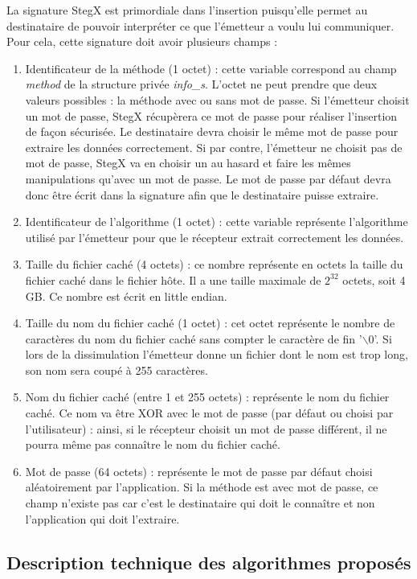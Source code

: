 \documentclass[11pt]{article}
\begin{document}
La signature StegX est primordiale dans l'insertion puisqu'elle permet au 
destinataire de pouvoir interpréter ce que l'émetteur a voulu lui communiquer. 
Pour cela, cette signature doit avoir plusieurs champs : 
\begin {enumerate}
\item Identificateur de la méthode (1 octet) : cette variable correspond au 
champ \textit{method} de la structure privée \textit{info\_s}. L'octet ne 
peut prendre que deux valeurs possibles : la méthode avec ou sans mot de 
passe. Si l'émetteur choisit un mot de passe, StegX récupèrera ce mot de 
passe pour réaliser l'insertion de façon sécurisée. Le destinataire devra 
choisir le même mot de passe pour extraire les données correctement. 
Si par contre, l'émetteur ne choisit pas de mot de passe, StegX va en choisir 
un au hasard et faire les mêmes manipulations qu'avec un mot de passe. 
Le mot de passe par défaut devra donc être écrit dans la signature afin que 
le destinataire puisse extraire. 
\item Identificateur de l'algorithme (1 octet) : cette variable représente 
l'algorithme utilisé par l'émetteur pour que le récepteur extrait correctement 
les données. 
\item Taille du fichier caché (4 octets) : ce nombre représente en octets 
la taille du fichier caché dans le fichier hôte. Il a une taille maximale 
de $2^{32}$ octets, soit 4 GB. Ce nombre est écrit en little endian. 
\item Taille du nom du fichier caché (1 octet) : cet octet représente le 
nombre de caractères du nom du fichier caché sans compter le caractère de 
fin '$\backslash$0'. Si lors de la dissimulation l'émetteur donne un fichier 
dont le nom est trop long, son nom sera coupé à 255 caractères. 
\item Nom du fichier caché (entre 1 et 255 octets) : représente le nom du 
fichier caché. Ce nom va être XOR avec le mot de passe (par défaut ou choisi
par l'utilisateur) : ainsi, si le récepteur choisit un mot de passe différent, 
il ne pourra même pas connaître le nom du fichier caché. 
\item Mot de passe (64 octets) : représente le mot de passe par défaut choisi 
aléatoirement par l'application. Si la méthode est avec mot de passe, 
ce champ n'existe pas car c'est le destinataire qui doit le connaître et 
non l'application qui doit l'extraire. 
\end{enumerate}

\subsection{Description technique des algorithmes proposés}
\end{document}
